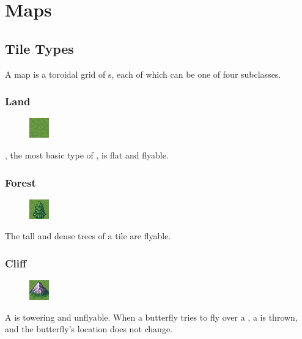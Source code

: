 \documentclass{pset}
\begin{document}
\ifx \MAPS \undefined \else
\section{Maps}\label{sec:maps}
\ifx \TILETYPES \undefined \else
\subsection{Tile Types}
A map is a toroidal grid of s, each of which can be one of four
subclasses.
\subsubsection{Land}
\begin{figure}
    \centering
    \vspace{-20pt}
    \includegraphics{img/land.png}
    \vspace{-20pt}
\end{figure}
, the most basic type of , is flat and flyable.

\subsubsection{Forest}
\begin{figure}
    \centering
    \vspace{-20pt}
    \includegraphics{img/forest_land.png}
    \vspace{-20pt}
\end{figure}
The tall and dense trees of a  tile are flyable.

\subsubsection{Cliff}
\begin{figure}
    \centering
    \vspace{-20pt}
    \includegraphics{img/cliff_land.png}
    \vspace{-20pt}
\end{figure}
A  is towering and unflyable. When a butterfly tries to fly over a
, a  is thrown, and the butterfly's
location does not change.
\end{document}
